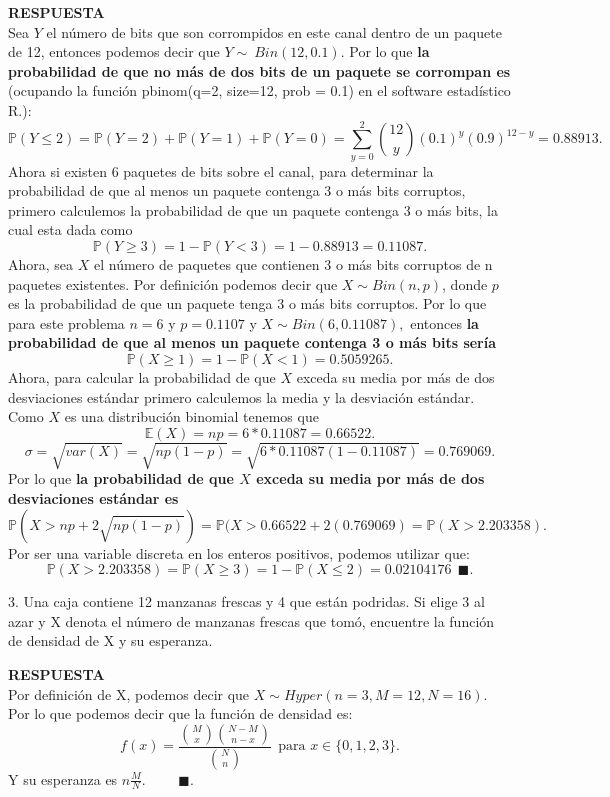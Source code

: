 \documentclass[11pt,letterpaper]{article}
\newcommand{\mP}{\mathbb{P}}
\newcommand{\mE}{\mathbb{E}}
\newcommand{\res}{\textbf{RESPUESTA}\\}
\newcommand{\fin}{$\blacksquare.$}
\newcommand{\finf}{\blacksquare.}
\begin{document}
\begin{itemize}
\res
Sea $Y$ el número de bits que son corrompidos en este canal dentro de un paquete de 12, entonces podemos decir que $Y\sim \ Bin(12,0.1)$. Por lo que \textbf{la probabilidad de que no más de dos bits de un paquete se corrompan es} (ocupando la función \textsf{pbinom(q=2, size=12, prob = 0.1)} en el software estadístico R.):
$$\mP(Y\leq2)= \mP(Y=2)+\mP(Y=1)+\mP(Y=0)=\sum_{y=0}^2{12 \choose y}(0.1)^y(0.9)^{12-y}=0.88913.$$
Ahora si existen 6 paquetes de bits sobre el canal, para determinar la probabilidad de que al menos un paquete contenga 3 o más bits corruptos, primero calculemos la probabilidad de que un paquete contenga 3 o más bits, la cual esta dada como 
$$\mP(Y\geq3) = 1-\mP(Y<3)=1-0.88913= 0.11087.$$
Ahora, sea $X$ el número de paquetes que contienen 3 o más bits corruptos de n paquetes existentes. Por definición podemos decir que $X\sim Bin(n,p)$, donde $p$ es la probabilidad de que un paquete tenga 3 o más bits corruptos. Por lo que para este problema $n=6$ y $p=0.1107$ y $X\sim Bin(6,0.11087),$ entonces \textbf{la probabilidad de que al menos un paquete contenga 3 o más bits sería}
$$\mP(X\geq1)=1-\mP(X<1)=0.5059265.$$
Ahora, para calcular la probabilidad de que $X$ exceda su media por más de dos desviaciones estándar primero calculemos la media y la desviación estándar. Como $X$ es una distribución binomial tenemos que 
$$\mE(X)=np=6*0.11087=0.66522.$$
$$\sigma=\sqrt{var(X)} =\sqrt{np(1-p)}=\sqrt{6*0.11087(1-0.11087)}=0.769069.$$
Por lo que \textbf{la probabilidad de que $X$ exceda su media por más de dos desviaciones estándar es}
$$\mP(X>np+2\sqrt{np(1-p)})=\mP(X>0.66522+2(0.769069)=\mP(X> 2.203358).$$
Por ser una variable discreta en los enteros positivos, podemos utilizar que:
$$\mP(X> 2.203358)=\mP (X\geq 3)=1-\mP(X\leq2)=0.02104176 \ \ \finf$$

3. Una caja contiene 12 manzanas frescas y 4 que están podridas. Si elige 3 al azar y X denota el
número de manzanas frescas que tomó, encuentre la función de densidad de X y su esperanza.

\res 
Por definición de X, podemos decir que $X\sim Hyper(n=3, M=12, N=16)$. Por lo que podemos decir que la función de densidad es:
\begin{equation*}
f(x)= \frac{{M\choose x}{N-M\choose n-x}}{{N\choose n}}\ \ \text{para } x\in \{0,1,2,3\}.
\end{equation*}
Y su esperanza es $n\frac{M}{N}.$ \ \ \ \ \fin
\end{itemize}
\end{document}
